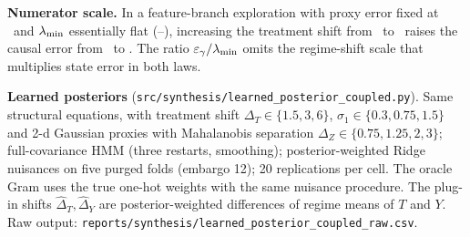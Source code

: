 \textbf{Numerator scale.} In a feature-branch exploration with proxy error fixed at \DEEps\ and $\lambda_{\min}$ essentially flat (\DELamLo--\DELamHi), increasing the treatment shift from \DETLo\ to \DETHi\ raises the causal error from \DEErrLo\ to \DEErrHi. The ratio $\varepsilon_\gamma/\lambda_{\min}$ omits the regime-shift scale that multiplies state error in both laws.

\textbf{Learned posteriors} (\texttt{src/synthesis/learned\_posterior\_coupled.py}). Same structural equations, with treatment shift $\Delta_T\in\{1.5,3,6\}$, $\sigma_1\in\{0.3,0.75,1.5\}$ and 2-d Gaussian proxies with Mahalanobis separation $\Delta_Z\in\{0.75,1.25,2,3\}$; full-covariance HMM (three restarts, smoothing); posterior-weighted Ridge nuisances on five purged folds (embargo 12); 20 replications per cell. The oracle Gram uses the true one-hot weights with the same nuisance procedure. The plug-in shifts $\hat\Delta_T,\hat\Delta_Y$ are posterior-weighted differences of regime means of $T$ and $Y$. Raw output: \texttt{reports/synthesis/learned\_posterior\_coupled\_raw.csv}.

